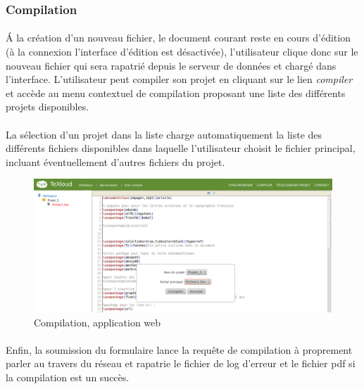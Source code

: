 \documentclass[a4paper,12pt]{article}
\begin{document}
\subsubsection{Compilation}
\paragraph*{}
\'A la création d'un nouveau fichier, le document courant reste en cours d'édition (à la connexion l'interface d'édition est désactivée), l'utilisateur clique donc sur le nouveau fichier qui sera rapatrié depuis le serveur de données et chargé dans l'interface.
L'utilisateur peut compiler son projet en cliquant sur le lien \emph{compiler} et accède au menu contextuel de compilation proposant une liste des différents projets disponibles.

\clearpage
\paragraph*{}
La sélection d'un projet dans la liste charge automatiquement la liste des différents fichiers disponibles dans laquelle l'utilisateur choisit le fichier principal, incluant éventuellement d'autres fichiers du projet.

\begin{figure}[!ht]
\begin{center}
  \includegraphics[width=1\textwidth]{./images/screenshot/Compiler.png}
\end{center}
  \caption{Compilation, application web}
  \label{compilation}
\end{figure}

\paragraph*{}
Enfin, la soumission du formulaire lance la requête de compilation à proprement parler au travers du réseau et rapatrie le fichier de log d'erreur et le fichier pdf si la compilation est un succès.
\end{document}
